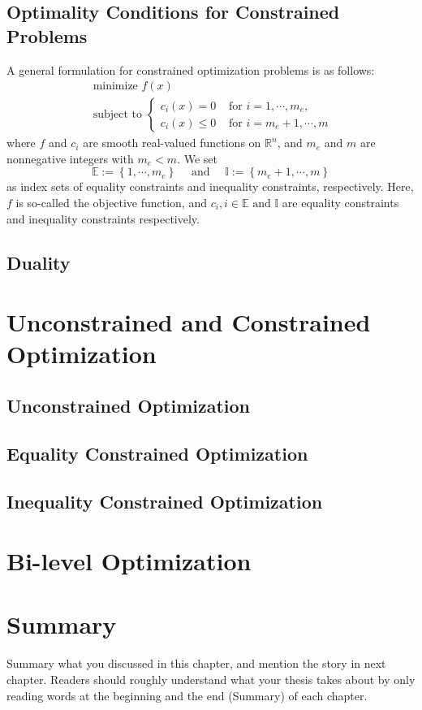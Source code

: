 \subsection{Optimality Conditions for Constrained Problems}
A general formulation for constrained optimization problems is as follows: 
$$
\begin{array}{l}\textrm { minimize } f(x) \\ \textrm { subject to }\left\{\begin{array}{ll}c_{i}(x)=0 & \textrm { for } i=1, \cdots, m_{e}, \\ c_{i}(x) \leq 0 & \textrm { for } i=m_{e}+1, \cdots, m\end{array}\right.\end{array}
$$
where $f$ and $c_i$ are smooth real-valued functions on $\mathbb{R}^n$, and $m_e$ and $m$ are nonnegative integers with $m_e < m$. We set 
$$
\mathbb{E}:=\left\{1, \cdots, m_{e}\right\} \quad \textrm { and } \quad \mathbb{I}:=\left\{m_{e}+1, \cdots, m\right\}
$$
as index sets of equality constraints and inequality constraints, respectively. Here, $f$ is so-called the objective function, and $c_i, i \in \mathbb{E} \textrm{ and } \mathbb{I}$ are equality constraints and inequality constraints respectively. 




\subsection{Duality}


\section{Unconstrained and Constrained Optimization}
\label{sec:consopt}
\subsection{Unconstrained Optimization}
\subsection{Equality Constrained Optimization}
\subsection{Inequality Constrained Optimization}

\section{Bi-level Optimization}
\label{sec:bilevel}



\section{Summary}
\label{sec:2summary}
Summary what you discussed in this chapter, and mention the story in next
chapter. Readers should roughly understand what your thesis takes about by only reading
words at the beginning and the end (Summary) of each chapter.



